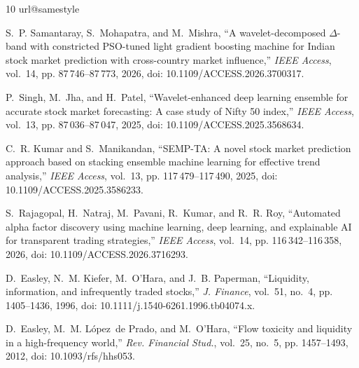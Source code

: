 \documentclass[conference]{IEEEtran}
\begin{document}
\FloatBarrier
\begin{thebibliography}{10}
\providecommand{\url}[1]{#1}
\csname url@samestyle\endcsname
\providecommand{\newblock}{\relax}
\providecommand{\bibinfo}[2]{#2}
\providecommand{\BIBentrySTDinterwordspacing}{\spaceskip=0pt\relax}
\providecommand{\BIBentryALTinterwordstretchfactor}{4}
\providecommand{\BIBentryALTinterwordspacing}{\spaceskip=\fontdimen2\font plus
\BIBentryALTinterwordstretchfactor\fontdimen3\font minus
  \fontdimen4\font\relax}
\providecommand{\BIBforeignlanguage}[2]{{%
\expandafter\ifx\csname l@#1\endcsname\relax
\typeout{** WARNING: IEEEtran.bst: No hyphenation pattern has been}%
\typeout{** loaded for the language `#1'. Using the pattern for}%
\typeout{** the default language instead.}%
\else
\language=\csname l@#1\endcsname
\fi
#2}}
\providecommand{\BIBdecl}{\relax}\BIBdecl

S.~P. Samantaray, S.~Mohapatra, and M.~Mishra, ``A wavelet-decomposed
  {$\Delta$}-band with constricted {PSO}-tuned light gradient boosting machine for {Indian} stock market
  prediction with cross-country market influence,'' \emph{IEEE Access}, vol.~14, pp. 87\,746--87\,773, 2026,
  doi: \url{10.1109/ACCESS.2026.3700317}.

P.~Singh, M.~Jha, and H.~Patel, ``Wavelet-enhanced deep learning ensemble for accurate
  stock market forecasting: A case study of {Nifty} 50 index,'' \emph{IEEE Access}, vol.~13, pp.
  87\,036--87\,047, 2025, doi: \url{10.1109/ACCESS.2025.3568634}.

C.~R. Kumar and S.~Manikandan, ``{SEMP-TA}: A novel stock market prediction approach
  based on stacking ensemble machine learning for effective trend analysis,'' \emph{IEEE Access}, vol.~13, pp.
  117\,479--117\,490, 2025, doi: \url{10.1109/ACCESS.2025.3586233}.

S.~Rajagopal, H.~Natraj, M.~Pavani, R.~Kumar, and R.~R. Roy, ``Automated alpha factor
  discovery using machine learning, deep learning, and explainable {AI} for transparent trading strategies,''
  \emph{IEEE Access}, vol.~14, pp. 116\,342--116\,358, 2026, doi: \url{10.1109/ACCESS.2026.3716293}.

D.~Easley, N.~M. Kiefer, M.~O'Hara, and J.~B. Paperman, ``Liquidity,
  information, and infrequently traded stocks,'' \emph{J. Finance}, vol.~51,
  no.~4, pp. 1405--1436, 1996, doi: \url{10.1111/j.1540-6261.1996.tb04074.x}.

D.~Easley, M.~M. L{\'o}pez~de Prado, and M.~O'Hara, ``Flow toxicity and
  liquidity in a high-frequency world,'' \emph{Rev. Financial Stud.}, vol.~25,
  no.~5, pp. 1457--1493, 2012, doi: \url{10.1093/rfs/hhs053}.


\end{thebibliography}
\end{document}
